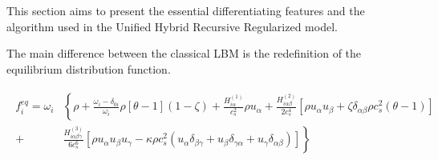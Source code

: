 This section aims to present the essential differentiating features and the algorithm used in the Unified Hybrid Recursive Regularized model.

The main difference between the classical LBM is the redefinition of the equilibrium 
distribution function.


\begin{align}
	\begin{split}
		f_{i}^{eq} = \omega_{i} & \left\{ \rho + \frac{\omega_{i} - \delta_{0i}}{\omega_{i}} \rho \left[ \theta - 1 \right] (1 - \zeta) + \frac{H_{i\alpha}^{(1)}}{c_{s}^{2}} \rho u_{\alpha} + \frac{H_{i\alpha\beta}^{(2)}}{2c_{s}^{4}} \left[ \rho u_{\alpha} u_{\beta} + \zeta \delta_{\alpha\beta} \rho c_{s}^{2} (\theta - 1) \right] \right.\\ 
		+ &  \left.  \frac{H_{i\alpha\beta\gamma}^{(3)}}{6c_{s}^{6}} \left[ \rho u_{\alpha} u_{\beta} u_{\gamma} - \kappa \rho c_{s}^{2} (u_{\alpha} \delta_{\beta\gamma} + u_{\beta} \delta_{\gamma\alpha} + u_{\gamma} \delta_{\alpha\beta}) \right] \right\}
	\end{split}
\end{align}



